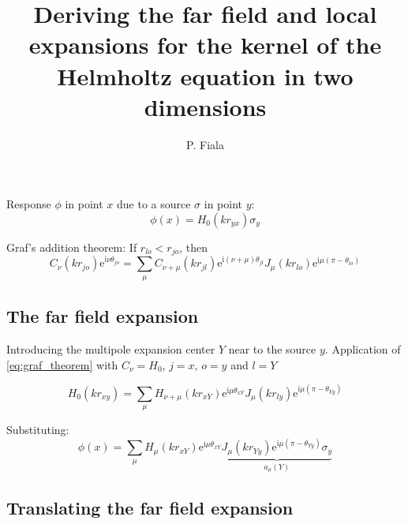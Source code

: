 \documentclass[11pt,a4paper]{article}
\author{P. Fiala}
\title{Deriving the far field and local expansions for the kernel of the
Helmholtz equation in two dimensions}
\newcommand{\ti}{\mathrm{i}}
\newcommand{\te}{\mathrm{e}}
\begin{document}
\maketitle

Response $\phi$ in point $x$ due to a source $\sigma$ in point $y$:
%
\begin{equation}
	\phi(x)
	=
	H_{0}(k r_{yx})
	\sigma_y
	\label{eq:origin}
\end{equation}

Graf's addition theorem: If $r_{lo} < r_{jo}$, then
%
\begin{equation}
	C_{\nu}(k r_{jo})
	\te^{\ti \nu \theta_{jo}}
	=
	\sum_{\mu} C_{\nu + \mu}(k r_{jl})
	\te^{\ti (\nu + \mu) \theta_{jl}}
	J_{\mu}(k r_{lo})
	\te^{\ti \mu(\pi-\theta_{lo})}
	\label{eq:graf_theorem}
\end{equation}

\subsection{The far field expansion}

Introducing the multipole expansion center $Y$ near to the source $y$.
Application of \eqref{eq:graf_theorem} with $C_{\nu} = H_0$, $j = x$, $o = y$ and $l = Y$

\begin{equation}
	H_{0}(k r_{xy})
	=
	\sum_{\mu} H_{\nu + \mu}(k r_{xY})
	\te^{\ti \mu \theta_{xY}}
	J_{\mu}(k r_{ly})
	\te^{\ti \mu(\pi-\theta_{Yy})}
\end{equation}

Substituting:
\begin{equation}
	\phi(x)
	=
	\sum_{\mu}
	H_{\mu}(k r_{xY})
	\te^{\ti \mu \theta_{xY}}
	\underbrace{
	J_{\mu}(k r_{Yy})
	\te^{\ti \mu(\pi-\theta_{Yy})}
	\sigma_y
	}_{a_{\mu}(Y)}
	\label{eq:far_field}
\end{equation}

\subsection{Translating the far field expansion}
\end{document}
